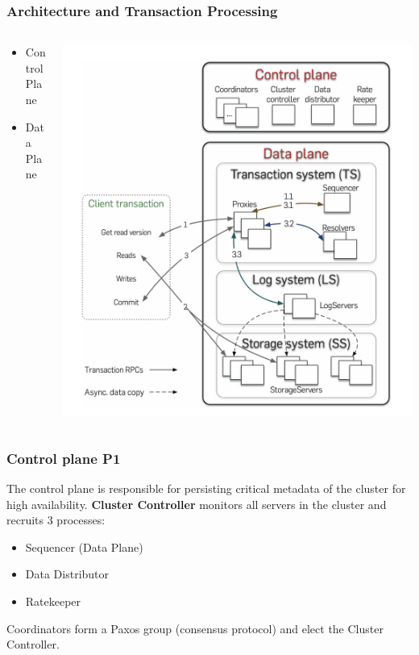 \begin{frame}
    \frametitle{Architecture and Transaction Processing}
    \begin{columns}
        \begin{column}{0.5\textwidth}
            \begin{itemize}
                \item Control Plane
                \item Data Plane
            \end{itemize}
        \end{column}
        \begin{column}{0.5\textwidth}
            \centering
            \includegraphics[width=\textwidth]{img/2-Architecture/Architecture and transaction processing.png}
        \end{column}
    \end{columns}
\end{frame}



\begin{frame}
	\frametitle{Control plane P1}

The control plane is responsible for persisting critical metadata of the cluster for high availability.
\textbf{Cluster Controller} monitors all servers in the cluster and recruits 3 processes:
\begin{itemize}
    \item Sequencer (Data Plane)
    \item Data Distributor
    \item Ratekeeper
\end{itemize}

Coordinators form a Paxos group (consensus protocol) and elect the Cluster Controller.
\end{frame}

